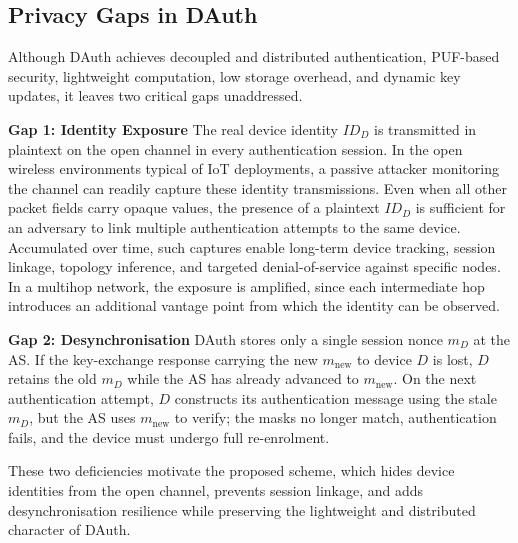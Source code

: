 \subsection{Privacy Gaps in DAuth}

Although DAuth achieves decoupled and distributed authentication,
PUF-based security, lightweight computation, low storage overhead, and dynamic key
updates, it leaves two critical gaps unaddressed.

\textbf{Gap 1: Identity Exposure}
The real device identity $ID_D$ is transmitted in plaintext on the open channel in
every authentication session.
In the open wireless environments typical of IoT deployments, a passive attacker
monitoring the channel can readily capture these identity transmissions.
Even when all other packet fields carry opaque values, the presence of a plaintext
$ID_D$ is sufficient for an adversary to link multiple authentication attempts to
the same device.
Accumulated over time, such captures enable long-term device tracking, session
linkage, topology inference, and targeted denial-of-service against specific nodes.
In a multihop network, the exposure is amplified, since each intermediate hop
introduces an additional vantage point from which the identity can be observed.

\textbf{Gap 2: Desynchronisation}
DAuth stores only a single session nonce $m_D$ at the AS.
If the key-exchange response carrying the new $m_{\mathrm{new}}$ to device $D$ is
lost, $D$ retains the old $m_D$ while the AS has already advanced to $m_{\mathrm{new}}$.
On the next authentication attempt, $D$ constructs its authentication message using
the stale $m_D$, but the AS uses $m_{\mathrm{new}}$ to verify; the masks no longer
match, authentication fails, and the device must undergo full re-enrolment.

These two deficiencies motivate the proposed scheme, which hides device identities
from the open channel, prevents session linkage, and adds desynchronisation
resilience while preserving the lightweight and distributed character of DAuth.
